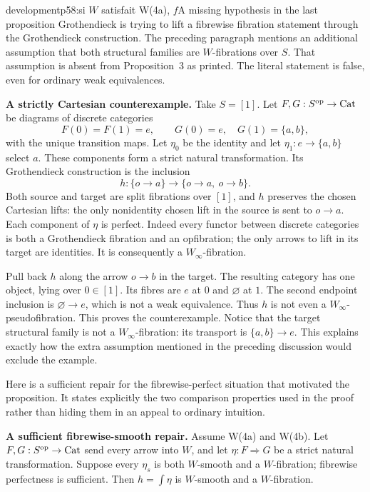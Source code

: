 \begin{dcomment}{development}{p58:si $W$ satisfait W(4a), $f$}{A missing hypothesis in the last proposition}
Grothendieck is trying to lift a fibrewise fibration statement through the Grothendieck construction. The preceding paragraph mentions an additional assumption that both structural families are $W$-fibrations over $S$. That assumption is absent from Proposition~3 as printed. The literal statement is false, even for ordinary weak equivalences.

\textbf{A strictly Cartesian counterexample.}\ours\quad
Take $S=[1]$. Let $F,G:S^{\mathrm{op}}\to\mathrm{Cat}$ be diagrams of discrete categories
\[
 F(0)=F(1)=e,\qquad
 G(0)=e,\quad G(1)=\{a,b\},
\]
with the unique transition maps. Let $\eta_0$ be the identity and let $\eta_1:e\to\{a,b\}$ select $a$. These components form a strict natural transformation. Its Grothendieck construction is the inclusion
\[
 h:\{o\to a\}\longrightarrow\{o\to a,\ o\to b\}.
\]
Both source and target are split fibrations over $[1]$, and $h$ preserves the chosen Cartesian lifts: the only nonidentity chosen lift in the source is sent to $o\to a$. Each component of $\eta$ is perfect. Indeed every functor between discrete categories is both a Grothendieck fibration and an opfibration; the only arrows to lift in its target are identities. It is consequently a $W_\infty$-fibration.

Pull back $h$ along the arrow $o\to b$ in the target. The resulting category has one object, lying over $0\in[1]$. Its fibres are $e$ at $0$ and $\varnothing$ at $1$. The second endpoint inclusion is $\varnothing\to e$, which is not a weak equivalence. Thus $h$ is not even a $W_\infty$-pseudofibration. This proves the counterexample. Notice that the target structural family is not a $W_\infty$-fibration: its transport is $\{a,b\}\to e$. This explains exactly how the extra assumption mentioned in the preceding discussion would exclude the example.

Here is a sufficient repair for the fibrewise-perfect situation that motivated the proposition. It states explicitly the two comparison properties used in the proof rather than hiding them in an appeal to ordinary intuition.

\textbf{A sufficient fibrewise-smooth repair.}\ours\quad
Assume W(4a) and W(4b). Let $F,G:S^{\mathrm{op}}\to\mathrm{Cat}$ send every arrow into $W$, and let $\eta:F\Rightarrow G$ be a strict natural transformation. Suppose every $\eta_s$ is both $W$-smooth and a $W$-fibration; fibrewise perfectness is sufficient. Then $h=\int\eta$ is $W$-smooth and a $W$-fibration.


\end{dcomment}
